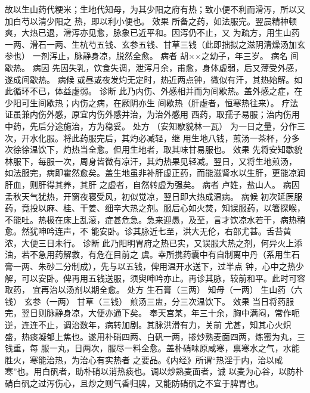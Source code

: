 \documentclass[a4paper,12pt,UTF8,twoside]{ctexbook}
\begin{document}
故以生山药代粳米；生地代知母，为其少阳之府有热；致小便不利而滑泻，所以又加白芍以清少阳之 
热，即以利小便也。 
效果 所备之药，如法服完。翌晨精神顿爽，大热已退，滑泻亦见愈，脉象已近平和。因泻仍不止，又 
为疏方，用生山药一两、滑石一两、生杭芍五钱、玄参五钱、甘草三钱（此即拙拟之滋阴清燥汤加玄参也） 
一剂泻止，脉静身凉，脱然全愈。 
病者 胡××之幼子，年三岁。 
病名 间歇热。 
病因 先因失乳，饮食失调，泄泻月余，甫愈，身体虚弱，后又薄受外感，遂成间歇热。 
病候 或昼或夜发灼无定时，热近两点钟，微似有汗，其热始解。如此循环不已，体益虚弱。 
诊断 此乃内伤、外感相并而为间歇热。盖外感之症，在少阳可生间歇热；内伤之病，在厥阴亦生 
间歇热（肝虚者，恒寒热往来）。 
疗法 证虽兼内伤外感，原宜内伤外感并治，为治外感用 
西药，取孺子易服；治内伤用中药，先后分途施治，方为稳妥。 
处方 （安知歇貌林一瓦） 为一日之量，分作三次，开水化服。将此药服完后，其灼必减轻，继 
用生地八钱，煎汤一茶杯，分多次徐徐温饮下，灼热当全愈。但用生地者，取其味甘易服也。 
效果 先将安知歇貌林服下，每服一次，周身皆微有凉汗，其灼热果见轻减。翌日，又将生地煎汤， 
如法服完，病即霍然愈矣。盖生地虽非补肝虚正药，而能滋肾水以生肝，更能凉润肝血，则肝得其养，其肝 
之虚者，自然转虚为强矣。 
病者 卢姓，盐山人。 
病因 孟秋天气犹热，开窗夜寝受风，初似觉凉，翌日即大热成温病。 
病候 初次延医服药，竟投以麻、桂、干姜、细辛大热之剂。服后心如火焚，知误服药，以箸探喉， 
不能吐。热极在床上乱滚，症甚危急。急来迎愚，及至，言才饮凉水若干，病热稍愈。然犹呻吟连声，不 
能安卧。诊其脉近七至，洪大无伦，右部尤甚。舌苔黄浓，大便三日未行。 
诊断 此乃阳明胃府之热已实，又误服大热之剂，何异火上添油，若不急用药解救，有危在目前之 
虞。幸所携药囊中有自制离中丹（系用生石膏一两、朱砂二分制成），先与以五钱，俾用温开水送下，过半点 
钟，心中之热少解，可以安卧。俾再用五钱送服，须臾呻吟亦止。再诊其脉，较前和平。此时可容取药， 
宜再治以汤剂以期全愈。 
处方 生石膏（三两） 知母（一两） 生山药（六钱） 玄参（一两） 
甘草（三钱） 煎汤三盅，分三次温饮下。 
效果 当日将药服完，翌日则脉静身凉，大便亦通下矣。 
奉天宫某，年三十余，胸中满闷，常作呃逆，连连不止，调治数年，病转加剧。其脉洪滑有力，关前 
尤甚，知其心火炽盛，热痰凝郁上焦也。遂用朴硝四两、白矾一两，掺炒熟麦面四两，炼蜜为丸，三钱重，每 
服一丸，日两次，服尽一料全愈。盖朴硝味原咸寒，禀寒水之气，水能胜火，寒能治热，为治心有实热者 
之要品。《内经》所谓“热淫于内，治以咸寒”也。用白矾者，助朴硝以消热痰也。调以炒熟麦面者，诚 
以麦为心谷，以防朴硝白矾之过泻伤心，且炒之则气香归脾，又能防硝矾之不宜于脾胃也。 
\end{document}
